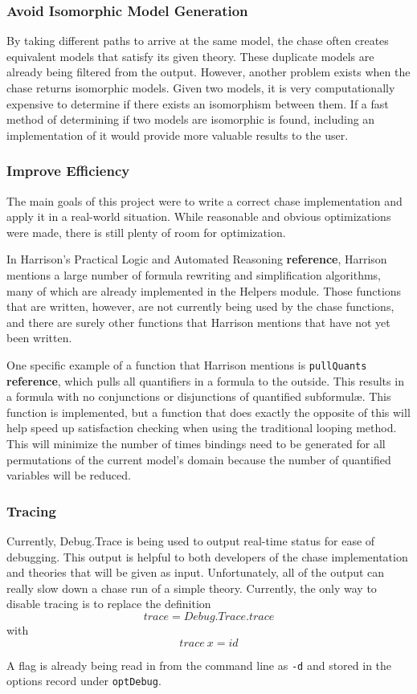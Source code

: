 		\subsubsection{Avoid Isomorphic Model Generation}

			By taking different paths to arrive at the same model, the chase
			often creates equivalent models that satisfy its given theory.
			These duplicate models are already being filtered from the output.
			However, another problem exists when the chase returns isomorphic
			models. Given two models, it is very computationally expensive to
			determine if there exists an isomorphism between them. If a fast
			method of determining if two models are isomorphic is found,
			including an implementation of it would provide more valuable
			results to the user.

		\subsubsection{Improve Efficiency}

			The main goals of this project were to write a correct chase
			implementation and apply it in a real-world situation. While
			reasonable and obvious optimizations were made, there is still
			plenty of room for optimization.

			In Harrison's Practical Logic and Automated Reasoning
			\textbf{reference}, Harrison mentions a large number of formula
			rewriting and simplification algorithms, many of which are already
			implemented in the Helpers module. Those functions that are
			written, however, are not currently being used by the chase
			functions, and there are surely other functions that Harrison
			mentions that have not yet been written.

			One specific example of a function that Harrison mentions is
			{\tt pullQuants} \textbf{reference}, which pulls all quantifiers in
			a formula to the outside. This results in a formula with no
			conjunctions or disjunctions of quantified subformul{\ae}. This
			function is implemented, but a function that does exactly the
			opposite of this will help speed up satisfaction checking when
			using the traditional looping method. This will minimize the number
			of times bindings need to be generated for all permutations of the
			current model's domain because the number of quantified variables
			will be reduced.

		\subsubsection{Tracing}

			Currently, Debug.Trace is being used to output real-time status for
			ease of debugging. This output is helpful to both developers of
			the chase implementation and theories that will be given as input.
			Unfortunately, all of the output can really slow down a chase run
			of a simple theory. Currently, the only way to disable tracing is
			to replace the definition \[trace = Debug.Trace.trace\] with
			\[trace\ x = id\]

			A flag is already being read in from the command line as {\tt -d}
			and stored in the options record under {\tt optDebug}.
